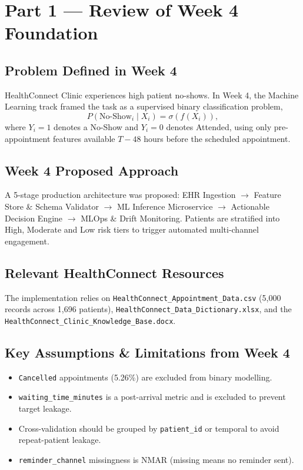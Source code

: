 \documentclass[11pt,a4paper]{article}
\begin{document}
\newpage
\tableofcontents
\newpage

\section{Part 1 — Review of Week 4 Foundation}
\subsection{Problem Defined in Week 4}
HealthConnect Clinic experiences high patient no-shows. In Week 4, the Machine Learning track framed
the task as a supervised binary classification problem,
\begin{equation}
P(\text{No-Show}_i \mid X_i) = \sigma(f(X_i)),
\end{equation}
where $Y_i = 1$ denotes a No-Show and $Y_i = 0$ denotes Attended, using only pre-appointment
features available $T-48$ hours before the scheduled appointment.

\subsection{Week 4 Proposed Approach}
A 5-stage production architecture was proposed: EHR Ingestion $\rightarrow$ Feature Store \& Schema
Validator $\rightarrow$ ML Inference Microservice $\rightarrow$ Actionable Decision Engine
$\rightarrow$ MLOps \& Drift Monitoring. Patients are stratified into High, Moderate and Low risk
tiers to trigger automated multi-channel engagement.

\subsection{Relevant HealthConnect Resources}
The implementation relies on \texttt{HealthConnect\_Appointment\_Data.csv} (5,000 records across
1,696 patients), \texttt{HealthConnect\_Data\_Dictionary.xlsx}, and the
\texttt{HealthConnect\_Clinic\_Knowledge\_Base.docx}.

\subsection{Key Assumptions \& Limitations from Week 4}
\begin{itemize}
    \item \texttt{Cancelled} appointments (5.26\%) are excluded from binary modelling.
    \item \texttt{waiting\_time\_minutes} is a post-arrival metric and is excluded to prevent
          target leakage.
    \item Cross-validation should be grouped by \texttt{patient\_id} or temporal to avoid
          repeat-patient leakage.
    \item \texttt{reminder\_channel} missingness is NMAR (missing means no reminder sent).
\end{itemize}
\end{document}
